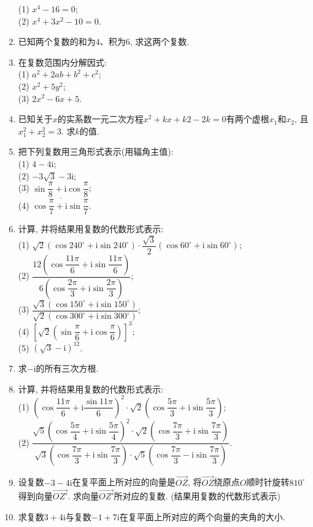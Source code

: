 \documentclass[10pt,a4paper]{article}
\begin{document}
\begin{enumerate}[1.]
(1) $x^4-16=0$;\\
(2) $x^4+3x^2-10=0$.
\item 已知两个复数的和为$4$、积为$6$, 求这两个复数.
\item 在复数范围内分解因式:\\
(1) $a^2+2ab+b^2+c^2$;\\
(2) $x^2+5y^2$;\\
(3) $2x^2-6x+5$.
\item 已知关于$x$的实系数一元二次方程$x^2+kx+k2-2k=0$有两个虚根$x_1$和$x_2$, 且$x_1^2+x_2^2=3$. 求$k$的值.
\item 把下列复数用三角形式表示(用辐角主值):\\
(1) $4-4\mathrm{i}$;\\
(2) $-3\sqrt 3-3\mathrm{i}$;\\
(3) $\sin \dfrac \pi 8+\mathrm{i}\cos \dfrac \pi 8$;\\
(4) $\overline{\cos \dfrac \pi 7+\mathrm{i}\sin\dfrac \pi 7}$.
\item 计算, 并将结果用复数的代数形式表示:\\
(1) $\sqrt 2(\cos 240^\circ +\mathrm{i}\sin 240^\circ)\cdot \dfrac{\sqrt 3}2(\cos 60^\circ +\mathrm{i}\sin 60^\circ)$;\\
(2) $\dfrac{12(\cos \dfrac{11\pi} 6+\mathrm{i}\sin \dfrac{11\pi} 6)}{6(\cos \dfrac{2\pi} 3+\mathrm{i}\sin \dfrac{2\pi}3)}$;\\
(3) $\dfrac{\sqrt 3(\cos 150^\circ +\mathrm{i}\sin 150^\circ)}{\sqrt 2(\cos 300^\circ +\mathrm{i}\sin 300^\circ)}$;\\
(4) $[\sqrt 2(\sin \dfrac\pi 6+\mathrm{i}\cos \dfrac \pi 6)]^3$;\\
(5) $(\sqrt 3-\mathrm{i})^{12}$.
\item 求$-\mathrm{i}$的所有三次方根.
\item 计算, 并将结果用复数的代数形式表示:\\
(1) $(\cos \dfrac{11\pi}6 +\mathrm{i}\dfrac{\sin 11\pi}6)^2\cdot \sqrt 2(\cos \dfrac{5\pi} 3+\mathrm{i}\sin \dfrac{5\pi}3)$;\\
(2) $\dfrac{\sqrt 5(\cos \dfrac{5\pi} 4+\mathrm{i}\sin \dfrac{5\pi} 4)^2\cdot \sqrt 2(\cos \dfrac{7\pi} 3+\mathrm{i}\sin \dfrac{7\pi} 3)}{
\sqrt 3(\cos \dfrac{7\pi} 3+\mathrm{i}\sin \dfrac{7\pi} 3)\cdot \sqrt 5(\cos \dfrac{7\pi} 3-\mathrm{i}\sin \dfrac{7\pi} 3)}$.
\item 设复数$-3-4\mathrm{i}$在复平面上所对应的向量是$\overrightarrow{OZ}$, 将$\overrightarrow{OZ}$绕原点$O$顺时针旋转$810^\circ$得到向量$\overrightarrow{OZ'}$. 求向量$\overrightarrow{OZ'}$所对应的复数. (结果用复数的代数形式表示)
\item 求复数$3+4\mathrm{i}$与复数$-1+7\mathrm{i}$在复平面上所对应的两个向量的夹角的大小.  


\iffalse




















\fi

\end{enumerate}
\end{document}
